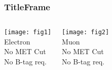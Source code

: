 \begin{frame}\frametitle{TitleFrame}
	\begin{columns}[T]
    		\centering
    		\texttt{[image: fig1]}\\
    		Electron\\No MET Cut\\No B-tag req.

    		\centering
    		\texttt{[image: fig2]}\\
    		Muon\\No MET Cut\\No B-tag req.
	\end{columns}
\end{frame}
